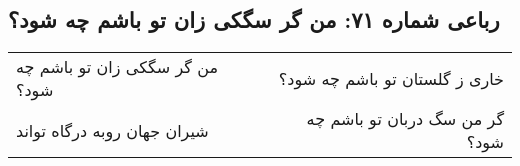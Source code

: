 \begin{center}
\section*{رباعی شماره ۷۱: من گر سگکی زان تو باشم چه شود؟}
\label{sec:071}
\begin{longtable}{l p{0.5cm} r}
من گر سگکی زان تو باشم چه شود؟
&&
خاری ز گلستان تو باشم چه شود؟
\\
شیران جهان روبه درگاه تواند
&&
گر من سگ دربان تو باشم چه شود؟
\\
\end{longtable}
\end{center}
